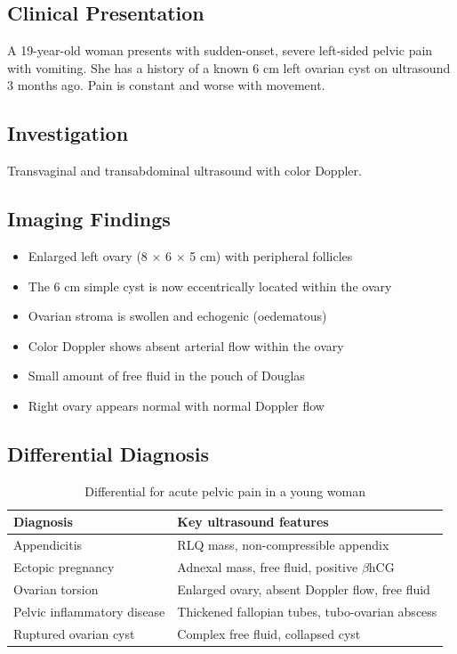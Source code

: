\subsection{Clinical Presentation}
A 19-year-old woman presents with sudden-onset, severe left-sided pelvic pain with vomiting. She has a history of a known 6 cm left ovarian cyst on ultrasound 3 months ago. Pain is constant and worse with movement.

\subsection{Investigation}
Transvaginal and transabdominal ultrasound with color Doppler.

\subsection{Imaging Findings}
\begin{itemize}
    \item Enlarged left ovary (8 $\times$ 6 $\times$ 5 cm) with peripheral follicles
    \item The 6 cm simple cyst is now eccentrically located within the ovary
    \item Ovarian stroma is swollen and echogenic (oedematous)
    \item Color Doppler shows absent arterial flow within the ovary
    \item Small amount of free fluid in the pouch of Douglas
    \item Right ovary appears normal with normal Doppler flow
\end{itemize}

\subsection{Differential Diagnosis}
\begin{table}[h]
\centering
\caption{Differential for acute pelvic pain in a young woman}
\begin{tabular}{|p{}|p{}|}
\hline
\textbf{Diagnosis} & \textbf{Key ultrasound features} \\
\hline
Appendicitis & RLQ mass, non-compressible appendix \\
\hline
Ectopic pregnancy & Adnexal mass, free fluid, positive $\beta$hCG \\
\hline
Ovarian torsion & Enlarged ovary, absent Doppler flow, free fluid \\
\hline
Pelvic inflammatory disease & Thickened fallopian tubes, tubo-ovarian abscess \\
\hline
Ruptured ovarian cyst & Complex free fluid, collapsed cyst \\
\hline
\end{tabular}
\end{table}

